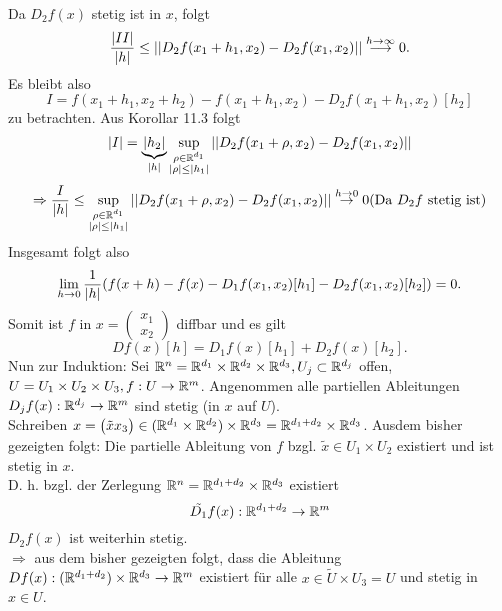\documentclass[../ana2.tex]{subfiles}
\begin{document}
\begin{bew}
\begin{align*}
    \end{align*}
    Da \( D_2f(x) \) stetig ist in \(x\), folgt 
    \[ \frac{\left|II\right|}{\left|h\right|} \leq \left|\left| D_2 f(x_1 + h_1, x_2) - D_2 f(x_1, x_2) \right|\right| 
    \overset{h\rightarrow \infty}{\longrightarrow} 0. \]
    Es bleibt also 
    \[ I = f(x_1 + h_1, x_2 + h_2) - f(x_1 + h_1, x_2) - D_2 f(x_1 + h_1, x_2)[h_2] \]
    zu betrachten.
    Aus Korollar 11.3 folgt
    \[ \left|I\right| = \underbrace{\left|h_2\right|}_{\left|h\right|} \underset{
    \substack{
        \rho \in \mathbb{R}^{d_1}\\
        \left|\rho\right| \leq \left|h_1\right|
    }}{\sup} \left|\left|D_2f(x_1+\rho, x_2) - D_2f(x_1, x_2)\right|\right| \]
    \[ \Rightarrow \frac{I}{\left|h\right|} \leq \underset{
        \substack{
            \rho \in \mathbb{R}^{d_1}\\
            \left|\rho\right| \leq \left|h_1\right|
        }}{\sup} \left|\left|D_2f(x_1+\rho, x_2) - D_2f(x_1, x_2)\right|\right|
        \overset{h \rightarrow 0}{\rightarrow} 0 
        (\text{Da } D_2f \text{ stetig ist}) \]    
    Insgesamt folgt also 
    \[ \lim\limits_{h\rightarrow{}0} \frac{1}{\left|h\right|} (f(x + h) - f(x) 
    - D_1f(x_1, x_2)[h_1] 
    - D_2 f(x_1, x_2)[h_2] ) = 0. \]
    Somit ist \(f\) in \(x = \begin{pmatrix}x_1\\x_2\end{pmatrix} \) 
    diffbar und es gilt 
    \[ Df(x)[h] = D_1 f(x)[h_1] + D_2f(x)[h_2]. \]    
    Nun zur Induktion:
    Sei \( \mathbb{R}^n = \mathbb{R}^{d_1} \times \mathbb{R}^{d_2} 
    \times \mathbb{R}^{d_3}, U_j \subset \mathbb{R}^{d_j} \) offen, 
    \( U = U_1 \times U_2 \times U_3, f:U\rightarrow \mathbb{R}^m \). 
    Angenommen alle partiellen Ableitungen 
    \( D_j f(x):\mathbb{R}^{d_j}\rightarrow \mathbb{R}^m \) 
    sind stetig (in \(x\) auf \(U\)). \\
    Schreiben \( x = \begin{pmatrix} \tilde{x} x_3 \end{pmatrix} 
    \in (\mathbb{R}^{d_1} \times \mathbb{R}^{d_2}) \times \mathbb{R}^{d_3} 
    = \mathbb{R}^{d_1 + d_2} \times \mathbb{R}^{d_3} \).        
    Ausdem bisher gezeigten folgt: Die partielle Ableitung von
    \(f\) bzgl. \(\tilde{x} \in U_1 \times U_2\) existiert und 
    ist stetig in \(x\).\\
    D. h. bzgl. der Zerlegung \( \mathbb{R}^n = \mathbb{R}^{d_1 + d_2} \times \mathbb{R}^{d_3} \) 
    existiert \[ \tilde{D_1} f(x):\mathbb{R}^{d_1 + d_2}\rightarrow \mathbb{R}^m \]
    \( D_2f(x) \) ist weiterhin stetig.\\
    \( \Rightarrow \) aus dem bisher gezeigten folgt, dass 
    die Ableitung \( Df(x):(\mathbb{R}^{d_1 + d_2}) \times \mathbb{R}^{d_3}\rightarrow \mathbb{R}^m \) 
    existiert für alle \( x\in \tilde{U} \times U_3 = U \) und stetig 
    in \( x \in U \).
\end{bew}
\end{document}
